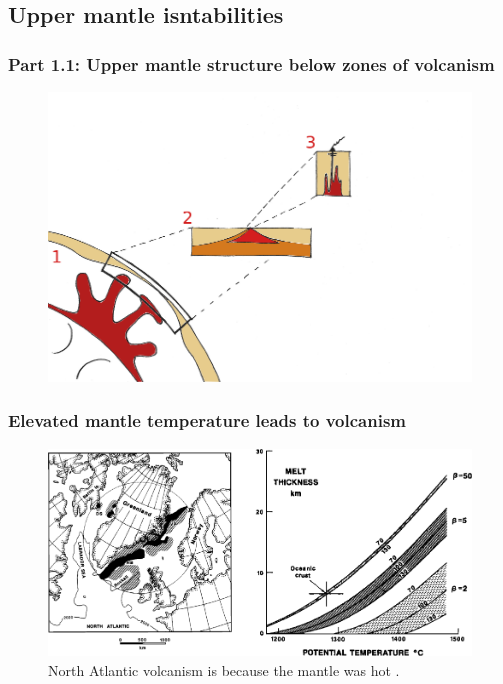 \documentclass[aspectratio=169]{beamer}
\begin{document}
\subsection{Upper mantle isntabilities}

\begin{frame}
    \frametitle{Part 1.1: Upper mantle structure below zones of volcanism}
    \begin{figure}
        \includegraphics[height=0.9\paperheight]{./pictures/drawing.png}
    \end{figure}
\end{frame}

\begin{frame}
    \frametitle{Elevated mantle temperature leads to volcanism}
    \begin{figure}
        \includegraphics[height=0.6\paperheight]{./figures/mckenzie.png}
        \caption{North Atlantic volcanism is because the mantle was hot \citep{white-1995}.}
    \end{figure}
\end{frame}
\end{document}
